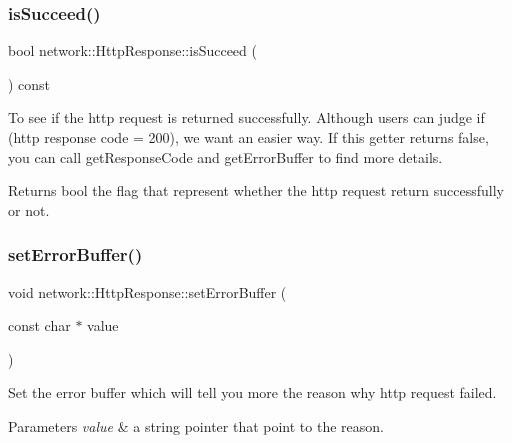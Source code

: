 \subsubsection{\texorpdfstring{is\+Succeed()}{isSucceed()}\hspace{0.1cm}{\footnotesize\ttfamily [2/2]}}
{\footnotesize\ttfamily bool network\+::\+Http\+Response\+::is\+Succeed (\begin{DoxyParamCaption}{ }\end{DoxyParamCaption}) const\hspace{0.3cm}{\ttfamily [inline]}}

To see if the http request is returned successfully. Although users can judge if (http response code = 200), we want an easier way. If this getter returns false, you can call get\+Response\+Code and get\+Error\+Buffer to find more details. \begin{DoxyReturn}{Returns}
bool the flag that represent whether the http request return successfully or not. 
\end{DoxyReturn}
\mbox{\label{classnetwork_1_1HttpResponse_a45fe52ae0cb41f622a4e5e40f3b0a8ca}} 
\subsubsection{\texorpdfstring{set\+Error\+Buffer()}{setErrorBuffer()}\hspace{0.1cm}{\footnotesize\ttfamily [1/2]}}
{\footnotesize\ttfamily void network\+::\+Http\+Response\+::set\+Error\+Buffer (\begin{DoxyParamCaption}\item[{const char $\ast$}]{value }\end{DoxyParamCaption})\hspace{0.3cm}{\ttfamily [inline]}}

Set the error buffer which will tell you more the reason why http request failed. 
\begin{DoxyParams}{Parameters}
{\em value} & a string pointer that point to the reason. \\
\hline
\end{DoxyParams}
\mbox{\label{classnetwork_1_1HttpResponse_a45fe52ae0cb41f622a4e5e40f3b0a8ca}} 
